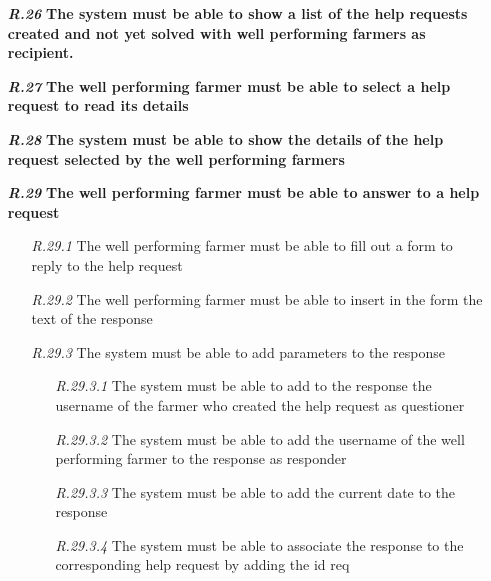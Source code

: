 \begin{itemize}
\item [\textbf{\textit{R.26}}] \textbf{The system must be able to show a list of the help requests created and not yet solved with well performing farmers as recipient.}
\item [\textbf{\textit{R.27}}] \textbf{The well performing farmer must be able to select a help request to read its details}
\item [\textbf{\textit{R.28}}] \textbf{The system must be able to show the details of the help request selected by the well performing farmers}
\item [\textbf{\textit{R.29}}] \textbf{The well performing farmer must be able to answer to a help request}
        \begin{itemize}
            \item [\textit{R.29.1}] The well performing farmer must be able to fill out a form to reply to the help request
            \item [\textit{R.29.2}] The well performing farmer must be able to insert in the form the text of the response
            \item [\textit{R.29.3}] The system must be able to add parameters to the response
            \begin{itemize}
                \item [\textit{R.29.3.1}] The system must be able to add to the response the username of the farmer who created the help request as questioner
                \item [\textit{R.29.3.2}] The system must be able to add the username of the well performing farmer to the response as responder
		        \item [\textit{R.29.3.3}] The system must be
		        able to add the current date to the response
		        \item [\textit{R.29.3.4}] The system must be able to associate the response to the corresponding help request by adding the id req
            \end{itemize}
        \end{itemize}



\end{itemize}

